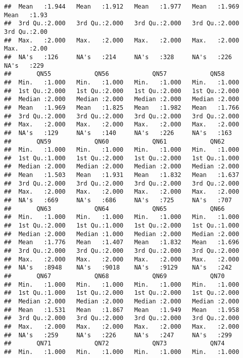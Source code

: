\documentclass[
]{article}
\begin{document}
\begin{verbatim}
##  Mean   :1.944   Mean   :1.912   Mean   :1.977   Mean   :1.969   Mean   :1.93  
##  3rd Qu.:2.000   3rd Qu.:2.000   3rd Qu.:2.000   3rd Qu.:2.000   3rd Qu.:2.00  
##  Max.   :2.000   Max.   :2.000   Max.   :2.000   Max.   :2.000   Max.   :2.00  
##  NA's   :126     NA's   :214     NA's   :328     NA's   :226     NA's   :229   
##       QN55            QN56            QN57            QN58      
##  Min.   :1.000   Min.   :1.000   Min.   :1.000   Min.   :1.000  
##  1st Qu.:2.000   1st Qu.:2.000   1st Qu.:2.000   1st Qu.:2.000  
##  Median :2.000   Median :2.000   Median :2.000   Median :2.000  
##  Mean   :1.969   Mean   :1.825   Mean   :1.982   Mean   :1.766  
##  3rd Qu.:2.000   3rd Qu.:2.000   3rd Qu.:2.000   3rd Qu.:2.000  
##  Max.   :2.000   Max.   :2.000   Max.   :2.000   Max.   :2.000  
##  NA's   :129     NA's   :140     NA's   :226     NA's   :163    
##       QN59            QN60            QN61            QN62      
##  Min.   :1.000   Min.   :1.000   Min.   :1.000   Min.   :1.000  
##  1st Qu.:1.000   1st Qu.:2.000   1st Qu.:2.000   1st Qu.:1.000  
##  Median :2.000   Median :2.000   Median :2.000   Median :2.000  
##  Mean   :1.503   Mean   :1.931   Mean   :1.832   Mean   :1.637  
##  3rd Qu.:2.000   3rd Qu.:2.000   3rd Qu.:2.000   3rd Qu.:2.000  
##  Max.   :2.000   Max.   :2.000   Max.   :2.000   Max.   :2.000  
##  NA's   :669     NA's   :686     NA's   :725     NA's   :707    
##       QN63            QN64            QN65            QN66      
##  Min.   :1.000   Min.   :1.000   Min.   :1.000   Min.   :1.000  
##  1st Qu.:2.000   1st Qu.:1.000   1st Qu.:2.000   1st Qu.:1.000  
##  Median :2.000   Median :1.000   Median :2.000   Median :2.000  
##  Mean   :1.776   Mean   :1.407   Mean   :1.832   Mean   :1.696  
##  3rd Qu.:2.000   3rd Qu.:2.000   3rd Qu.:2.000   3rd Qu.:2.000  
##  Max.   :2.000   Max.   :2.000   Max.   :2.000   Max.   :2.000  
##  NA's   :8948    NA's   :9018    NA's   :9129    NA's   :242    
##       QN67            QN68            QN69            QN70      
##  Min.   :1.000   Min.   :1.000   Min.   :1.000   Min.   :1.000  
##  1st Qu.:1.000   1st Qu.:2.000   1st Qu.:2.000   1st Qu.:2.000  
##  Median :2.000   Median :2.000   Median :2.000   Median :2.000  
##  Mean   :1.531   Mean   :1.867   Mean   :1.949   Mean   :1.958  
##  3rd Qu.:2.000   3rd Qu.:2.000   3rd Qu.:2.000   3rd Qu.:2.000  
##  Max.   :2.000   Max.   :2.000   Max.   :2.000   Max.   :2.000  
##  NA's   :259     NA's   :226     NA's   :247     NA's   :299    
##       QN71            QN72            QN73            QN74      
##  Min.   :1.000   Min.   :1.000   Min.   :1.000   Min.   :1.000  

\end{verbatim}
\end{document}
